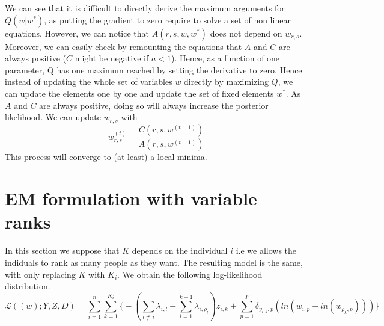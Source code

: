 \documentclass[12pt]{ociamthesis}  %
\begin{document}
	We can see that it is difficult to directly derive the maximum arguments for $Q(w|w^{*})$, as putting the gradient to zero require to solve a set of non linear equations. However, we can notice that $A(r,s,w,w^{*})$ does not depend on $w_{r,s}$. Moreover, we can easily check by remounting the equations that $A$ and $C$ are always positive ($C$ might be negative if $a < 1$). Hence, as a function of one parameter, Q has one maximum reached by setting the derivative to zero. Hence instead of updating the whole set of variables $w$ directly by maximizing $Q$, we can update the elements one by one and update the set of fixed elements $w^{*}$. As $A$ and $C$ are always positive, doing so will always increase the posterior likelihood. We can update $w_{r,s}$ with
	\begin{equation}
	w^{(t)}_{r,s} = \frac{C(r,s,w^{(t-1)})}{A(r,s,w^{(t-1)})}
	\end{equation}
	This process will converge to (at least) a local minima.
	\newpage
	
	\section{EM formulation with variable ranks}
	
	In this section we suppose that $K$ depends on the individual $i$ i.e we allows the indiduals to rank as many people as they want. The resulting model is the same, with only replacing $K$ with $K_{i}$.
	We obtain the following log-likelihood distribution.
	\begin{equation}
	\mathcal{L}((w);Y,Z,D) = \sum_{i = 1}^{n} \sum_{k = 1}^{K_{i}} \bigg\{ -(\sum_{l \neq i} \lambda_{i,l} - \sum_{l = 1}^{k - 1} \lambda_{i,\rho_{l}})z_{i,k} + \sum_{p = 1}^{P} \delta_{y_{i,k}, p} (ln(w_{i,p} + ln(w_{\rho_{k},p}))) \bigg\}
	\end{equation}
	
\end{document}
